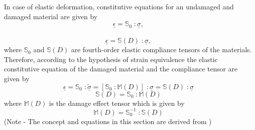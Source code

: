 \documentclass[12pt,a4paper,twoside,openright]{report}
\begin{document}
In case of elastic deformation, constitutive equations for an undamaged and damaged material are given by
\begin{equation}
\underline{\epsilon} = \mathbb{S}_{0}\; : \underline{\sigma},
\end{equation}\\
\begin{equation}
\underline{\epsilon} = \mathbb{S}(D)\; : \underline{\sigma},
\end{equation}
where $\mathbb{S}_{0}$ and $\mathbb{S}(D)$  are fourth-order elastic compliance tensors of the materials. Therefore, according to the hypothesis of strain equivalence the elastic constitutive equation of the damaged material and the compliance tensor are given by 
\begin{equation}
\underline{\epsilon} = \mathbb{S}_{0}\; : \underline{\tilde{\sigma}}  =  [\mathbb{S}_{0}\;: \mathbb{M} (D)]\;: \underline{\sigma} = \mathbb{S}(D)\; : \underline{\sigma}
\end{equation}
\begin{equation}
\mathbb{S}(D) = \mathbb{S}_{0}\; : \mathbb{M} (D)
 \label{eqn:S_HSeq}
\end{equation}
where $\mathbb{M} (D)$ is the damage effect tensor which is given by 
\begin{equation}
\mathbb{M} (D)  = \mathbb{S}_{0}^{-1} \; : \mathbb{S}(D) 
\end{equation}
(Note - The concept and equations in this section are derived from \citep{murakami2012continuum})
\end{document}
